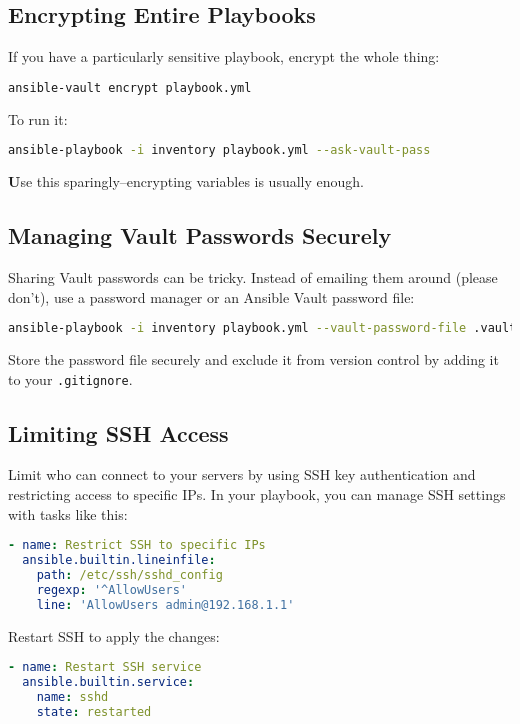 \subsection{Encrypting Entire Playbooks}

If you have a particularly sensitive playbook, encrypt the whole thing:
\begin{lstlisting}[language=bash, caption=Encrypting a Playbook]
ansible-vault encrypt playbook.yml
\end{lstlisting}

To run it:
\begin{lstlisting}[language=bash, caption=Running an Encrypted Playbook]
ansible-playbook -i inventory playbook.yml --ask-vault-pass
\end{lstlisting}

\textbf{U}se this sparingly--encrypting variables is usually enough.

\subsection{Managing Vault Passwords Securely}

Sharing Vault passwords can be tricky. Instead of emailing them around (please don't), use a password manager or an Ansible Vault password file:
\begin{lstlisting}[language=bash, caption=Using a Password File]
ansible-playbook -i inventory playbook.yml --vault-password-file .vault_pass
\end{lstlisting}

Store the password file securely and exclude it from version control by adding it to your \texttt{.gitignore}.

\subsection{Limiting SSH Access}

Limit who can connect to your servers by using SSH key authentication and restricting access to specific IPs. In your playbook, you can manage SSH settings with tasks like this:
\begin{lstlisting}[language=yaml, caption=Restricting SSH Access]
- name: Restrict SSH to specific IPs
  ansible.builtin.lineinfile:
    path: /etc/ssh/sshd_config
    regexp: '^AllowUsers'
    line: 'AllowUsers admin@192.168.1.1'
\end{lstlisting}

Restart SSH to apply the changes:
\begin{lstlisting}[language=yaml]
- name: Restart SSH service
  ansible.builtin.service:
    name: sshd
    state: restarted
\end{lstlisting}

